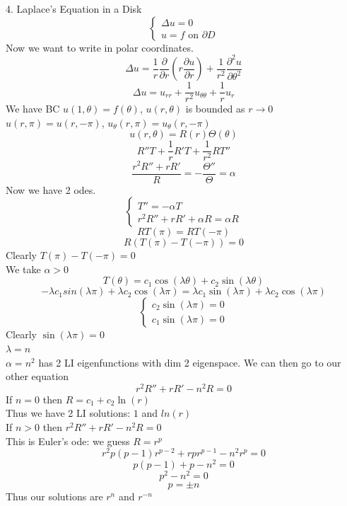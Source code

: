 \documentclass{article}
\begin{document}
4. Laplace's Equation in a Disk \\
$$\begin{cases}
    \Delta u = 0\\
    u = f \text{ on } \partial D
\end{cases}$$
Now we want to write in polar coordinates.\\
$$\Delta u = \frac{1}{r} \frac{\partial}{\partial r} \left( r \frac{\partial u}{\partial r} \right) + \frac{1}{r^2} \frac{\partial^2 u}{\partial \theta^2}$$
$$ \Delta u = u_{rr} + \frac{1}{r^2} u_{\theta \theta} + \frac{1}{r} u_r$$
We have BC $u(1, \theta) = f(\theta)$, $u(r,\theta)$ is bounded as $r \to 0$ $ u(r,\pi) = u(r, -\pi)$, $u_\theta(r, \pi) = u_\theta(r, -\pi)$\\
$$ u(r,\theta) = R(r) \Theta(\theta)$$
$$ R'' T + \frac{1}{r}R'T + \frac{1}{r^2}R T'' $$
$$ \frac{r^2 R'' + rR'}{R} = -\frac{\Theta''}{\Theta} = \alpha$$
Now we have 2 odes.\\
$$\begin{cases}
    T'' = -\alpha T\\
    r^2 R'' + rR' + \alpha R = \alpha R
\end{cases}$$
$$ RT(\pi) = RT(-\pi)$$
$$ R(T(\pi) - T(-\pi)) = 0$$
Clearly $T(\pi) - T(-\pi) = 0$\\
We take $\alpha > 0$\\
$$ T(\theta) = c_1 \cos(\lambda\theta) + c_2 \sin(\lambda\theta)$$
$$ -\lambda c_1 sin(\lambda \pi) + \lambda c_2 \cos(\lambda \pi) = \lambda c_1 \sin(\lambda \pi) + \lambda c_2 \cos(\lambda \pi)$$
$$\begin{cases}
    c_2 \sin(\lambda \pi) = 0\\
    c_1 \sin(\lambda \pi) = 0
\end{cases}$$
Clearly $\sin(\lambda \pi) = 0$\\
$\lambda = n$\\
$ \alpha = n^2$ has 2 LI eigenfunctions with dim 2 eigenspace.
We can then go to our other equation\\
$$ r^2 R'' + rR' - n^2 R = 0$$
If $n = 0$ then $R = c_1 + c_2 \ln(r)$\\
Thus we have 2 LI solutions: $1$ and $ln(r)$\\
If $n > 0$ then $r^2 R'' + rR' - n^2 R = 0$\\
This is Euler's ode: we guess $R = r^p$\\
$$ r^2 p(p-1) r^{p-2} + r p r^{p-1} - n^2 r^p = 0$$
$$ p(p-1) + p - n^2 = 0$$
$$ p^2 - n^2 = 0$$
$$ p = \pm n$$
Thus our solutions are $r^n$ and $r^{-n}$\\
\end{document}
